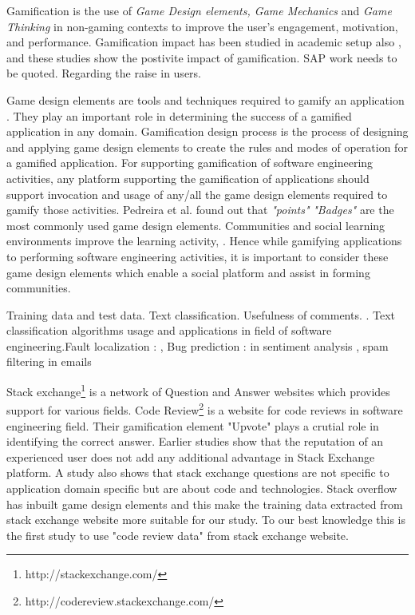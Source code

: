 \documentclass[conference]{IEEEtran}
\begin{document}

Gamification is the use of {\it Game Design elements, Game Mechanics} and {\it Game Thinking} in non-gaming contexts to improve the user’s engagement, motivation, and performance. Gamification impact has been studied in academic setup also \cite{Hakulinen2014}, \cite{Hakulinen2013} and these studies show the postivite impact of gamification. SAP work needs to be quoted. Regarding the raise in users.

Game design elements are tools and techniques required to gamify an application \cite{Adams2009}. They play an important role in determining the success of a gamified application in any domain. Gamification design process is the process of designing and applying game design elements to create the rules and modes of operation for a gamified application. For supporting gamification of software engineering activities, any platform supporting the gamification of applications should support invocation and usage of any/all the game design elements required to gamify those activities. Pedreira et al. \cite{Pedreira2015} found out that \textit{"points"} \textit{"Badges"} are the most commonly used game design elements. Communities and social learning environments improve the learning activity\cite{Vassileva2008},\cite{Begel2013} \cite{Etienne1998}. Hence while gamifying applications to  performing software engineering activities, it is important to consider these game design elements which enable a social platform and assist in forming communities.

Training data and test data. Text classification. Usefulness of comments.\cite{Bosu2015} \cite{Siersdorfer2010}.
Text classification algorithms usage and applications in field of software engineering.Fault localization : \cite{Roychowdhury2011} , Bug prediction : \cite{Jiang2007} in sentiment analysis \cite{Sharma2012}, spam filtering in emails \cite{Panigrahi2012}

 Stack exchange\footnote{http://stackexchange.com/} is a network of Question and Answer websites which provides support for various fields. Code Review\footnote{http://codereview.stackexchange.com/} is a website for code reviews in software engineering field. Their gamification element "Upvote" plays a crutial role in identifying the correct answer. Earlier studies \cite{Posnett2012} show that the reputation of an experienced user does not add any additional advantage in Stack Exchange platform. A study \cite{Allamanis2013} also shows that stack exchange questions are not specific to application domain specific but are about code and technologies. Stack  overflow has inbuilt game design elements\cite{Marder2015} and this make the training data extracted from stack exchange website more suitable for our study. To our best knowledge this is the first study to use "code review data" from stack exchange website.
\end{document}
